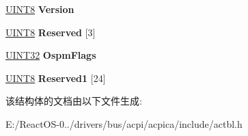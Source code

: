 \begin{DoxyCompactItemize}
\item 
\mbox{\label{structacpi__table__facs_af419ce02ea704526047f531205eade22}} 
\hyperlink{_processor_bind_8h_ab27e9918b538ce9d8ca692479b375b6a}{U\+I\+N\+T8} {\bfseries Version}
\item 
\mbox{\label{structacpi__table__facs_ae3b5c8eb61a713cdc51a69550599223d}} 
\hyperlink{_processor_bind_8h_ab27e9918b538ce9d8ca692479b375b6a}{U\+I\+N\+T8} {\bfseries Reserved} \mbox{[}3\mbox{]}
\item 
\mbox{\label{structacpi__table__facs_a369e02436506a59c9e5e2edc1661fafa}} 
\hyperlink{_processor_bind_8h_ae1e6edbbc26d6fbc71a90190d0266018}{U\+I\+N\+T32} {\bfseries Ospm\+Flags}
\item 
\mbox{\label{structacpi__table__facs_a9ddbe914b760bdae3d1839f28c22eb35}} 
\hyperlink{_processor_bind_8h_ab27e9918b538ce9d8ca692479b375b6a}{U\+I\+N\+T8} {\bfseries Reserved1} \mbox{[}24\mbox{]}
\end{DoxyCompactItemize}


该结构体的文档由以下文件生成\+:\begin{DoxyCompactItemize}
\item 
E\+:/\+React\+O\+S-\/0../drivers/bus/acpi/acpica/include/actbl.\+h\end{DoxyCompactItemize}
